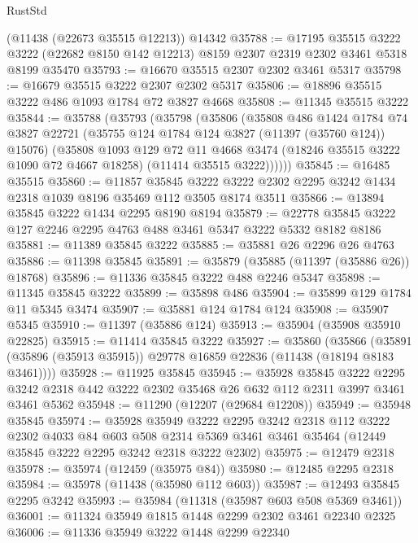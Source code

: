 \begin{lexlean}{RustStd}
\begin{coremodule}
    (@11438 (@22673 @35515 @12213))
    @14342
@35788 := @17195
    @35515
    @3222
    @3222
    (@22682 @8150 @142 @12213)
    @8159
    @2307
    @2319
    @2302
    @3461
    @5318
    @8199
    @35470
@35793 := @16670 @35515 @2307 @2302 @3461 @5317
@35798 := @16679 @35515 @3222 @2307 @2302 @5317
@35806 := @18896 @35515 @3222 @486 @1093 @1784 @72 @3827 @4668
@35808 := @11345 @35515 @3222
@35844 := @35788
    (@35793
      (@35798
        (@35806
          (@35808
            @486
            @1424
            @1784
            @74
            @3827
            @22721
            (@35755 @124 @1784 @124 @3827 (@11397 (@35760 @124)) @15076)
            (@35808
              @1093
              @129
              @72
              @11
              @4668
              @3474
              (@18246 @35515 @3222 @1090 @72 @4667 @18258)
              (@11414 @35515 @3222))))))
@35845 := @16485 @35515
@35860 := @11857
    @35845
    @3222
    @3222
    @2302
    @2295
    @3242
    @1434
    @2318
    @1039
    @8196
    @35469
    @112
    @3505
    @8174
    @3511
@35866 := @13894 @35845 @3222 @1434 @2295 @8190 @8194
@35879 := @22778 @35845 @3222 @127 @2246 @2295 @4763 @488 @3461 @5347 @3222 @5332 @8182 @8186
@35881 := @11389 @35845 @3222
@35885 := @35881 @26 @2296 @26 @4763
@35886 := @11398 @35845
@35891 := @35879 (@35885 (@11397 (@35886 @26)) @18768)
@35896 := @11336 @35845 @3222 @488 @2246 @5347
@35898 := @11345 @35845 @3222
@35899 := @35898 @486
@35904 := @35899 @129 @1784 @11 @5345 @3474
@35907 := @35881 @124 @1784 @124
@35908 := @35907 @5345
@35910 := @11397 (@35886 @124)
@35913 := @35904 (@35908 @35910 @22825)
@35915 := @11414 @35845 @3222
@35927 := @35860
    (@35866 (@35891 (@35896 (@35913 @35915)) @29778 @16859 @22836 (@11438 (@18194 @8183 @3461))))
@35928 := @11925 @35845
@35945 := @35928
    @35845
    @3222
    @2295
    @3242
    @2318
    @442
    @3222
    @2302
    @35468
    @26
    @632
    @112
    @2311
    @3997
    @3461
    @3461
    @5362
@35948 := @11290 (@12207 (@29684 @12208))
@35949 := @35948 @35845
@35974 := @35928
    @35949
    @3222
    @2295
    @3242
    @2318
    @112
    @3222
    @2302
    @4033
    @84
    @603
    @508
    @2314
    @5369
    @3461
    @3461
    @35464
    (@12449 @35845 @3222 @2295 @3242 @2318 @3222 @2302)
@35975 := @12479 @2318
@35978 := @35974 (@12459 (@35975 @84))
@35980 := @12485 @2295 @2318
@35984 := @35978 (@11438 (@35980 @112 @603))
@35987 := @12493 @35845 @2295 @3242
@35993 := @35984 (@11318 (@35987 @603 @508 @5369 @3461))
@36001 := @11324 @35949 @1815 @1448 @2299 @2302 @3461 @22340 @2325
@36006 := @11336 @35949 @3222 @1448 @2299 @22340

\end{coremodule}
\end{lexlean}
